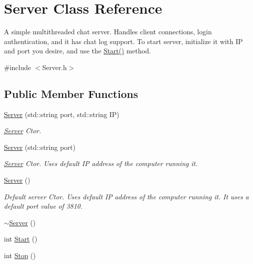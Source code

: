 \hypertarget{class_server}{}\section{Server Class Reference}
\label{class_server}


A simple multithreaded chat server. Handles client connections, login authentication, and it has chat log support. To start server, initialize it with I\+P and port you desire, and use the \hyperlink{class_server_ab4df36f477b273cd9f08a7e109f16973}{Start()} method.  




{\ttfamily \#include $<$Server.\+h$>$}

\subsection*{Public Member Functions}
\begin{DoxyCompactItemize}
\item 
\hyperlink{class_server_a1e425dda8d8951eb6f3f89e7742865e6}{Server} (std\+::string port, std\+::string I\+P)
\begin{DoxyCompactList}\small\item\em \hyperlink{class_server}{Server} Ctor. \end{DoxyCompactList}\item 
\hyperlink{class_server_a1eaaf9ba85b8206fa0aa6925a6a30a08}{Server} (std\+::string port)
\begin{DoxyCompactList}\small\item\em \hyperlink{class_server}{Server} Ctor. Uses default I\+P address of the computer running it. \end{DoxyCompactList}\item 
\hyperlink{class_server_ad5ec9462b520e59f7ea831e157ee5e59}{Server} ()
\begin{DoxyCompactList}\small\item\em Default server Ctor. Uses default I\+P address of the computer running it. It uses a default port value of 3810. \end{DoxyCompactList}\item 
\hyperlink{class_server_a4b3aa2579cb1c8cd1d069582c14d0fa6}{$\sim$\+Server} ()
\item 
int \hyperlink{class_server_ab4df36f477b273cd9f08a7e109f16973}{Start} ()
\item 
int \hyperlink{class_server_a358f3edffab323d5a454252c707352e6}{Stop} ()
\end{DoxyCompactItemize}


